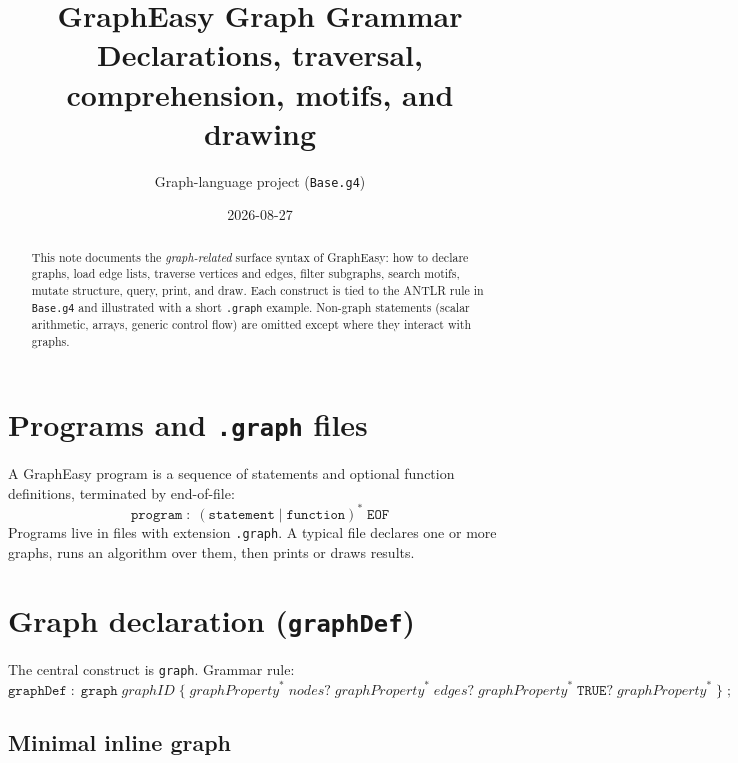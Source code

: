 \documentclass[11pt,a4paper]{article}
\title{\textbf{GraphEasy Graph Grammar}\\[0.3em]
\large Declarations, traversal, comprehension, motifs, and drawing}
\author{Graph-language project \quad (\texttt{Base.g4})}
\date{2026-08-27}
\newcommand{\kw}[1]{\texttt{\textcolor{codekw}{#1}}}
\begin{document}
\maketitle

\begin{abstract}
\noindent
This note documents the \emph{graph-related} surface syntax of GraphEasy:
how to declare graphs, load edge lists, traverse vertices and edges,
filter subgraphs, search motifs, mutate structure, query, print, and draw.
Each construct is tied to the ANTLR rule in \texttt{Base.g4} and illustrated
with a short \texttt{.graph} example. Non-graph statements (scalar arithmetic,
arrays, generic control flow) are omitted except where they interact with
graphs.
\end{abstract}

\tableofcontents
\newpage

\section{Programs and \texttt{.graph} files}

A GraphEasy program is a sequence of statements and optional function
definitions, terminated by end-of-file:
\[
  \texttt{program} \;:\; (\texttt{statement} \mid \texttt{function})^* \;\texttt{EOF}
\]
Programs live in files with extension \texttt{.graph}. A typical file
declares one or more graphs, runs an algorithm over them, then prints or
draws results.

\section{Graph declaration (\texttt{graphDef})}

The central construct is \kw{graph}. Grammar rule:
\[
  \texttt{graphDef} \;:\;
  \texttt{graph}\;\mathit{graphID}\;\{\;\mathit{graphProperty}^*\;
  \mathit{nodes}?\;\mathit{graphProperty}^*\;\mathit{edges}?\;
  \mathit{graphProperty}^*\;\texttt{TRUE}?\;\mathit{graphProperty}^*\;\}\;\texttt{;}
\]

\subsection{Minimal inline graph}
\end{document}
